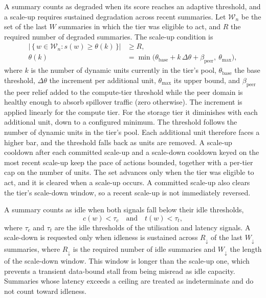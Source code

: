 ﻿\documentclass[12pt,reqno,twoside]{amsbook}
\begin{document}
    A summary counts as degraded when its score reaches an adaptive
threshold, and a scale-up requires sustained degradation across recent summaries. 
Let $\mathcal{W}_n$ be the set of the last $W$ summaries in which the tier was 
eligible to act, and $R$ the required number of degraded summaries. The scale-up
condition is
\begin{equation}\label{eq:scale_up_condition}
\begin{split}
    \left|\,\{\, w \in \mathcal{W}_n : s(w) \geq \theta(k) \,\}\right| &\geq R, \\
    \theta(k) &= \min\big(\theta_{\mathrm{base}} + k\,\Delta\theta + \beta_{\mathrm{peer}},\ \theta_{\max}\big),
\end{split}
\end{equation}
where $k$ is the number of dynamic units currently in the tier's pool,
$\theta_{\mathrm{base}}$ the base threshold, $\Delta\theta$ the increment per
additional unit, $\theta_{\max}$ its upper bound, and $\beta_{\mathrm{peer}}$
the peer relief added to the compute-tier threshold while the peer domain is
healthy enough to absorb spillover traffic (zero otherwise). The increment is
applied linearly for the compute tier. For the storage tier it diminishes with
each additional unit, down to a configured minimum.
The threshold follows the number of dynamic units in the tier's pool.
Each additional unit therefore faces a higher bar, and the threshold falls
back as units are removed. A scale-up cooldown after each committed scale-up
and a scale-down cooldown keyed on the most recent scale-up keep the pace of
actions bounded, together with a per-tier cap on the number of units. The
set advances only when the tier was eligible to act, and it is cleared when
a scale-up occurs. A committed scale-up also
clears the tier's scale-down window, so a recent scale-up is not immediately
reversed.

    A summary counts as idle when both signals fall below their idle
thresholds,
\begin{equation}\label{eq:idle_condition}
    c(w) < \tau_c \quad\text{and}\quad t(w) < \tau_t,
\end{equation}
where $\tau_c$ and $\tau_t$ are the idle thresholds of the utilisation and
latency signals.
A scale-down is requested only when idleness is sustained across
$R_\downarrow$ of the last $W_\downarrow$ summaries, where $R_\downarrow$ is the
required number of idle summaries and $W_\downarrow$ the length of the
scale-down window. This window is longer than the scale-up one, which
prevents a transient data-bound stall from being misread as idle capacity. 
Summaries whose latency exceeds a ceiling are
treated as indeterminate and do not count toward idleness.
\end{document}
